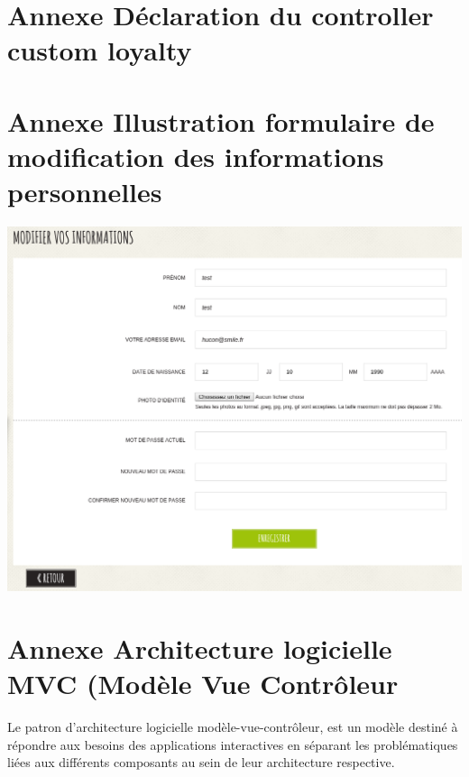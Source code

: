 \documentclass[a4paper,11pt,twoside]{report}
\begin{document}
  \newpage
  
  \section*{Annexe Déclaration du controller custom loyalty}
  \label{SL_loyalty_controller}
  
  
  \newpage
  
  \section*{Annexe Illustration formulaire de modification des informations personnelles}
  \begin{center}
      \includegraphics[width=\textwidth]{images/SL_account_information_form.png} 
      \label{SL_account_information_form}
  \end{center}
  
  \newpage
  
  \section*{Annexe Architecture logicielle MVC (Modèle Vue Contrôleur}
  Le patron d'architecture logicielle modèle-vue-contrôleur, est un modèle destiné à répondre aux besoins des applications interactives en séparant les problématiques liées aux différents composants au sein de leur architecture respective.
\end{document}
